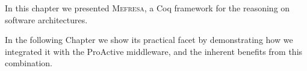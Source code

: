 	







\chapbreak

	In this chapter we presented \textsc{Mefresa}, a Coq framework for the reasoning on software architectures.
	
		In the following Chapter we show its practical facet by demonstrating how we integrated it		
		with the ProActive middleware, and the inherent benefits from this combination.



